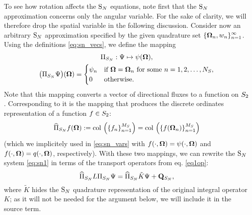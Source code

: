 To see how rotation affects the $\text{S}_{N}$ equations, note first that the $\text{S}_{N}$ approximation concerns only the angular
variable. For the sake of clarity, we will therefore drop the spatial variable in the following
discussion.
Consider now an arbitrary $\text{S}_{N}$ approximation specified by the given quadrature set
$\displaystyle\{\mathbf{\Omega}_n,w_n\}_{n=1}^{\infty}$.
Using the definitions \eqref{eq:sn_vecs}, we
define
the mapping
\begin{equation}\label{eq:map_SN}
\begin{gathered}
\Pi_{S_N}: \Psi \mapsto \psi(\mathbf{\Omega}),\\
\bigl(\Pi_{S_N} \Psi\bigr)(\mathbf{\Omega}) = 
\begin{cases}\displaystyle \psi_n & \mbox{if $\mathbf{\Omega} = \mathbf{\Omega}_n$ for some $n = 1,2,\ldots,N_S$},\\ 0 & \mbox{otherwise.} \end{cases}
\end{gathered}
\end{equation}
Note that this mapping converts a vector of directional fluxes to a function on $S_2$. Corresponding to it
is the mapping that produces the discrete ordinates representation of a function $f\in S_2$: 
\begin{equation}\label{eq:map_SN_inv}
	\widehat\Pi_{S_N} f(\mathbf{\Omega}) := \operatorname{col\,}\left(\left\{f_n \right\}_{n=1}^{M_S}\right)
	 = \operatorname{col\,}\left(\left\{f(\mathbf{\Omega}_n)\right\}_{n=1}^{M_S}\right)
\end{equation}
(which we implicitely used in \eqref{eq:sn_vars} with $f(\cdot,\mathbf{\Omega}) = \psi(\cdot,\mathbf{\Omega})$ and
$f(\cdot,\mathbf{\Omega}) = q(\cdot,\mathbf{\Omega})$, respectively). With these two mappings, we can rewrite the $\text{S}_{N}$ system \eqref{eq:sn1} in terms of 
the transport operators from eq.
\eqref{eq1op}:
\begin{equation}\label{eq:sn_op}
	\widehat\Pi_{S_N} L\Pi_{S_N} \Psi = \widehat\Pi_{S_N}\tilde K\Psi + \mathbf{Q}_{S_N},
\end{equation}
where $\tilde K$ hides the $\text{S}_{N}$ quadrature representation of the original integral operator $K$; as it
will not be needed for the argument below, we will include it in the source term.

